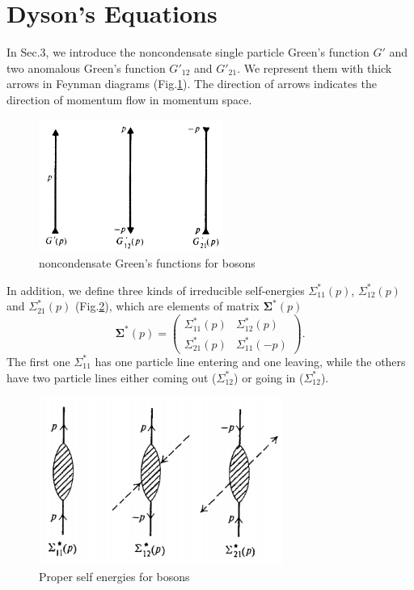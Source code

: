 \documentclass[12pt]{article}
\begin{document}
\noindent\hrulefill
\section{Dyson's Equations}
In Sec.3, we introduce the noncondensate single particle Green's function $G'$ 
and two anomalous Green's function $G'_{12}$ and $G'_{21}$. We represent them 
with thick arrows in Feynman diagrams (Fig.\ref{img5}). The direction of arrows 
indicates the direction of momentum flow in momentum space.
\begin{figure}[H]
    \centering
    \includegraphics[width=6cm]{p5.png}
    \renewcommand{\figurename}{Fig.}
    \caption{noncondensate Green's functions for bosons}
    \label{img5}
\end{figure}
In addition, we define three kinds of irreducible self-energies $\Sigma^*_{11}(p)$, 
$\Sigma^*_{12}(p)$ and $\Sigma^*_{21}(p)$ (Fig.\ref{img6}), which are elements of 
matrix $\boldsymbol{\Sigma}^*(p)$
\begin{equation}
    \boldsymbol{\Sigma}^*(p)=\left(\begin{matrix}
        \Sigma^*_{11}(p) &\Sigma^*_{12}(p)\\
        \Sigma^*_{21}(p) &\Sigma^*_{11}(-p)
    \end{matrix}\right).
\end{equation}
The first one $\Sigma^*_{11}$ has one particle line entering and one leaving, while 
the others have two particle lines either coming out ($\Sigma^*_{12}$) or going in 
($\Sigma^*_{12}$).
\begin{figure}[H]
    \centering
    \includegraphics[width=8cm]{p6.png}
    \renewcommand{\figurename}{Fig.}
    \caption{Proper self energies for bosons}
    \label{img6}
\end{figure}
\end{document}
